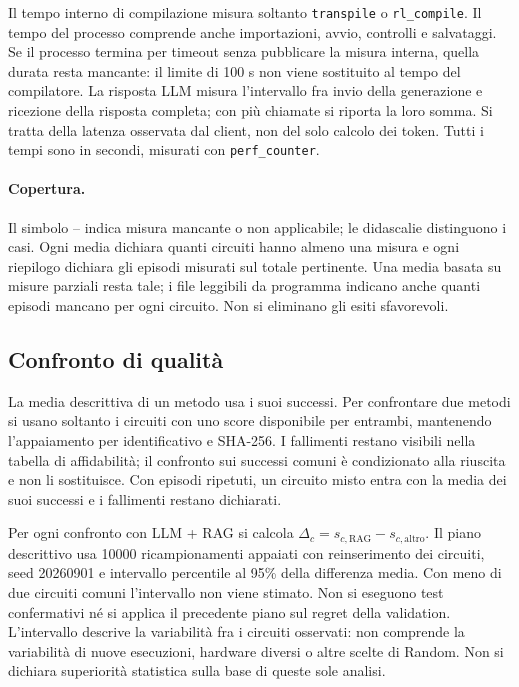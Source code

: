Il tempo interno di compilazione misura soltanto \texttt{transpile} o
\texttt{rl\_compile}. Il tempo del processo comprende anche importazioni, avvio,
controlli e salvataggi. Se il processo termina per timeout senza pubblicare la
misura interna, quella durata resta mancante: il limite di 100 s non viene
sostituito al tempo del compilatore. La risposta LLM misura l'intervallo fra
invio della generazione e ricezione della risposta completa; con più chiamate
si riporta la loro somma. Si tratta della latenza osservata dal client, non del
solo calcolo dei token. Tutti i tempi sono in secondi, misurati con
\texttt{perf\_counter}.

\paragraph{Copertura.}
Il simbolo -- indica misura mancante o non applicabile; le didascalie distinguono
i casi. Ogni media dichiara quanti circuiti hanno almeno una misura e ogni
riepilogo dichiara gli episodi misurati sul totale pertinente. Una media basata
su misure parziali resta tale; i file leggibili da programma indicano anche
quanti episodi mancano per ogni circuito. Non si eliminano gli esiti sfavorevoli.

\subsection{Confronto di qualità}
La media descrittiva di un metodo usa i suoi successi. Per confrontare due metodi
si usano soltanto i circuiti con uno score disponibile per entrambi, mantenendo
l'appaiamento per identificativo e SHA-256. I fallimenti restano visibili nella
tabella di affidabilità; il confronto sui successi comuni è condizionato alla
riuscita e non li sostituisce. Con episodi ripetuti, un circuito misto entra con
la media dei suoi successi e i fallimenti restano dichiarati.

Per ogni confronto con LLM + RAG si calcola
\(\Delta_c=s_{c,\mathrm{RAG}}-s_{c,\mathrm{altro}}\).
Il piano descrittivo usa 10000 ricampionamenti appaiati con reinserimento dei
circuiti, seed 20260901 e intervallo percentile al 95\% della differenza media.
Con meno di due circuiti comuni l'intervallo non viene stimato. Non si eseguono
test confermativi né si applica il precedente piano sul regret della validation.
L'intervallo descrive la variabilità fra i circuiti osservati: non comprende la
variabilità di nuove esecuzioni, hardware diversi o altre scelte di Random.
Non si dichiara superiorità statistica sulla base di queste sole analisi.
